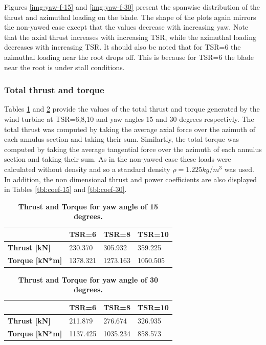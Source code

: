 Figures \ref{img:yaw-f-15} and \ref{img:yaw-f-30} present the spanwise distribution of the thrust and azimuthal loading on the blade. The shape of the plots again mirrors the non-yawed case except that the values decrease with increasing yaw. Note that the axial thrust increases with increasing TSR, while the azimuthal loading decreases with increasing TSR. It should also be noted that for TSR=6 the azimuthal loading near the root drops off. This is because for TSR=6 the blade near the root is under stall conditions.

\subsubsection{ \textbf{Total thrust and torque}}

Tables \ref{tbl:thrust-15} and \ref{tbl:thrust-30} provide the values of the total thrust and torque generated by the wind turbine at TSR=6,8,10 and yaw angles 15 and 30 degrees respectivly. The total thrust was computed by taking the average axial force over the azimuth of each annulus section and taking their sum. Similartly, the total torque was computed by taking the average tangential force over the azimuth of each annulus section and taking their sum. As in the non-yawed case these loads were calculated without density and so a standard density $\rho = 1.225 kg/m^3$ was used. In addition, the non dimensional thrust and power coefficients are also displayed in Tables \ref{tbl:coef-15} and \ref{tbl:coef-30}.
\begin{table}[h]
\caption{ \textbf{Thrust and Torque for yaw angle of 15 degrees.} }
\begin{tabular}{|l|l|l|l|}
\hline
   & \textbf{TSR=6} & \textbf{TSR=8} & \textbf{TSR=10}  \\ \hline
\textbf{Thrust {[}kN{]}} &   230.370    &  305.932    &   359.225     \\ \hline
\textbf{Torque {[}kN*m{]}} &  1378.321   &  1273.163     &   1050.505     \\ \hline
\end{tabular}
\label{tbl:thrust-15}
\end{table}

\begin{table}[h]
\caption{\textbf{Thrust and Torque for yaw angle of 30 degrees.}}
\begin{tabular}{|l|l|l|l|}
\hline
   & \textbf{TSR=6} & \textbf{TSR=8} & \textbf{TSR=10}  \\ \hline
\textbf{Thrust {[}kN{]}} &   211.879    &  276.674     &   326.935     \\ \hline
\textbf{Torque {[}kN*m{]}} &   1137.425    &  1035.234     &   858.573     \\ \hline
\end{tabular}
\label{tbl:thrust-30}
\end{table}

